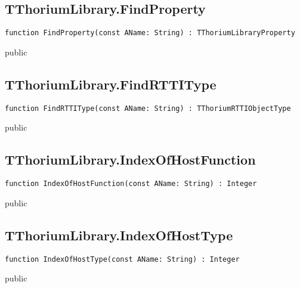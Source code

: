 \subsection{TThoriumLibrary.FindProperty}
\label{thoriumcore:thorium:tthoriumlibrary:findproperty}
\begin{FPCList}
\Synopsis
\Declaration 

\begin{verbatim}
function FindProperty(const AName: String) : TThoriumLibraryProperty
\end{verbatim}
\Visibility
public
\Description
\Errors
\end{FPCList}
\subsection{TThoriumLibrary.FindRTTIType}
\label{thoriumcore:thorium:tthoriumlibrary:findrttitype}
\begin{FPCList}
\Synopsis
\Declaration 

\begin{verbatim}
function FindRTTIType(const AName: String) : TThoriumRTTIObjectType
\end{verbatim}
\Visibility
public
\Description
\Errors
\end{FPCList}
\subsection{TThoriumLibrary.IndexOfHostFunction}
\label{thoriumcore:thorium:tthoriumlibrary:indexofhostfunction}
\begin{FPCList}
\Synopsis
\Declaration 

\begin{verbatim}
function IndexOfHostFunction(const AName: String) : Integer
\end{verbatim}
\Visibility
public
\Description
\Errors
\end{FPCList}
\subsection{TThoriumLibrary.IndexOfHostType}
\label{thoriumcore:thorium:tthoriumlibrary:indexofhosttype}
\begin{FPCList}
\Synopsis
\Declaration 

\begin{verbatim}
function IndexOfHostType(const AName: String) : Integer
\end{verbatim}
\Visibility
public
\Description
\Errors
\end{FPCList}
